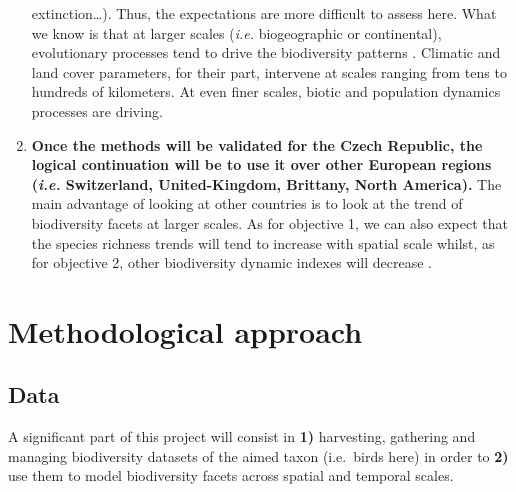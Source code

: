 \documentclass[
  12pt,
  oneside]{report}
\begin{document}
\begin{enumerate}
  extinction\ldots). Thus, the expectations are more difficult to assess here. What we know is that at
  larger scales (\emph{i.e.} biogeographic or continental), evolutionary processes tend to drive the
  biodiversity patterns \autocite{keil_downscaling_2014}. Climatic and land cover parameters, for their part,
  intervene at scales ranging from tens to hundreds of kilometers. At even finer scales, biotic
  and population dynamics processes are driving.
\item
  \textbf{Once the methods will be validated for the Czech Republic, the logical continuation will be to use it over other European regions (\textit{i.e.} Switzerland, United-Kingdom, Brittany, North America).} The main advantage of looking at other countries is to look at the trend of
  biodiversity facets at larger scales. As for objective 1, we can also expect that the species
  richness trends will tend to increase with spatial scale \autocite{chase_species_2019} whilst, as for
  objective 2, other biodiversity dynamic indexes will decrease \autocite{jarzyna_spatial_2015}.
\end{enumerate}

\hypertarget{method}{%
\chapter{Methodological approach}\label{method}}

\hypertarget{data}{%
\section{Data}\label{data}}

A significant part of this project will consist in \textbf{1)} harvesting, gathering and managing biodiversity
datasets of the aimed taxon (i.e.~birds here) in order to \textbf{2)} use them to model biodiversity facets
across spatial and temporal scales.
\end{document}
